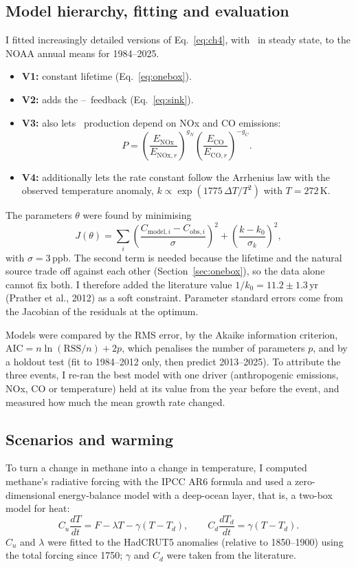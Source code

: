 \documentclass[11pt,a4paper]{article}
\newcommand{\CH}{\ce{CH4}}
\newcommand{\OH}{\ce{OH}}
\begin{document}
\subsection{Model hierarchy, fitting and evaluation}
I fitted increasingly detailed versions of Eq.~\eqref{eq:ch4}, with \OH\ in steady state, to the NOAA annual means for 1984--2025.
\begin{itemize}\itemsep0pt
\item \textbf{V1:} constant lifetime (Eq.~\ref{eq:onebox}).
\item \textbf{V2:} adds the \CH--\OH\ feedback (Eq.~\ref{eq:sink}).
\item \textbf{V3:} also lets \OH\ production depend on NOx and CO emissions:
\[P=\left(\frac{E_{\mathrm{NOx}}}{E_{\mathrm{NOx},r}}\right)^{g_N}\left(\frac{E_{\mathrm{CO}}}{E_{\mathrm{CO},r}}\right)^{-g_C}.\]
\item \textbf{V4:} additionally lets the rate constant follow the Arrhenius law with the observed temperature anomaly, $k\propto \exp(1775\,\Delta T/T^2)$ with $T=272$\,K.
\end{itemize}
The parameters $\theta$ were found by minimising
\begin{equation}
J(\theta)=\sum_{i}\left(\frac{C_{\mathrm{model},i}-C_{\mathrm{obs},i}}{\sigma}\right)^2+\left(\frac{k-k_0}{\sigma_k}\right)^2,
\end{equation}
with $\sigma=3$\,ppb. The second term is needed because the lifetime and the natural source trade off against each other (Section~\ref{sec:onebox}), so the data alone cannot fix both. I therefore added the literature value $1/k_0=11.2\pm1.3$\,yr (Prather et al., 2012) as a soft constraint. Parameter standard errors come from the Jacobian of the residuals at the optimum.

Models were compared by the RMS error, by the Akaike information criterion, $\mathrm{AIC}=n\ln(\mathrm{RSS}/n)+2p$, which penalises the number of parameters $p$, and by a holdout test (fit to 1984--2012 only, then predict 2013--2025). To attribute the three events, I re-ran the best model with one driver (anthropogenic emissions, NOx, CO or temperature) held at its value from the year before the event, and measured how much the mean growth rate changed.

\subsection{Scenarios and warming}
To turn a change in methane into a change in temperature, I computed methane's radiative forcing with the IPCC AR6 formula and used a zero-dimensional energy-balance model with a deep-ocean layer, that is, a two-box model for heat:
\begin{equation}
C_u\frac{dT}{dt}=F-\lambda T-\gamma(T-T_d),\qquad C_d\frac{dT_d}{dt}=\gamma(T-T_d).
\label{eq:ebm}
\end{equation}
$C_u$ and $\lambda$ were fitted to the HadCRUT5 anomalies (relative to 1850--1900) using the total forcing since 1750; $\gamma$ and $C_d$ were taken from the literature.
\end{document}

